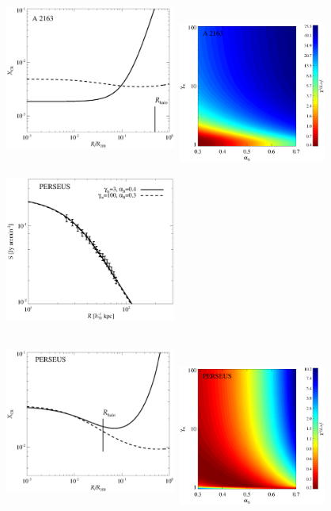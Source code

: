 \documentclass[useAMS,usenatbib]{mn2e}
\begin{document}
\begin{figure}
\includegraphics[width=5.6cm,height=5.6cm,keepaspectratio]{figures/XCR_A2163.eps}
\includegraphics[width=5cm,height=4.6cm]{figures/ProbA2163.eps}
\includegraphics[width=5.6cm,height=5.6cm,keepaspectratio]{figures/SB_Perseus.eps}
\includegraphics[width=5.6cm,height=5.6cm,keepaspectratio]{figures/XCR_Perseus.eps}
\includegraphics[width=5cm,height=4.6cm]{figures/ProbPerseus.eps}

\end{figure}
\end{document}
